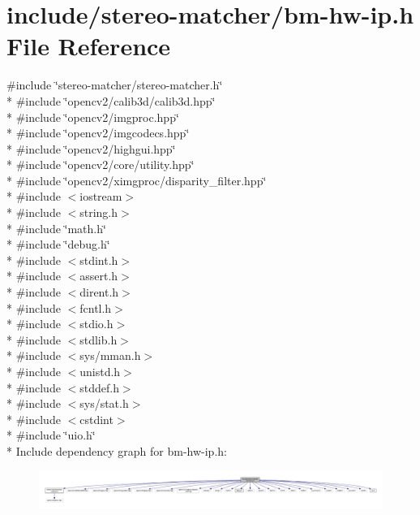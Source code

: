 \hypertarget{bm-hw-ip_8h}{}\section{include/stereo-\/matcher/bm-\/hw-\/ip.h File Reference}
\label{bm-hw-ip_8h}
{\ttfamily \#include \char`\"{}stereo-\/matcher/stereo-\/matcher.\+h\char`\"{}}\\*
{\ttfamily \#include \char`\"{}opencv2/calib3d/calib3d.\+hpp\char`\"{}}\\*
{\ttfamily \#include \char`\"{}opencv2/imgproc.\+hpp\char`\"{}}\\*
{\ttfamily \#include \char`\"{}opencv2/imgcodecs.\+hpp\char`\"{}}\\*
{\ttfamily \#include \char`\"{}opencv2/highgui.\+hpp\char`\"{}}\\*
{\ttfamily \#include \char`\"{}opencv2/core/utility.\+hpp\char`\"{}}\\*
{\ttfamily \#include \char`\"{}opencv2/ximgproc/disparity\+\_\+filter.\+hpp\char`\"{}}\\*
{\ttfamily \#include $<$iostream$>$}\\*
{\ttfamily \#include $<$string.\+h$>$}\\*
{\ttfamily \#include \char`\"{}math.\+h\char`\"{}}\\*
{\ttfamily \#include \char`\"{}debug.\+h\char`\"{}}\\*
{\ttfamily \#include $<$stdint.\+h$>$}\\*
{\ttfamily \#include $<$assert.\+h$>$}\\*
{\ttfamily \#include $<$dirent.\+h$>$}\\*
{\ttfamily \#include $<$fcntl.\+h$>$}\\*
{\ttfamily \#include $<$stdio.\+h$>$}\\*
{\ttfamily \#include $<$stdlib.\+h$>$}\\*
{\ttfamily \#include $<$sys/mman.\+h$>$}\\*
{\ttfamily \#include $<$unistd.\+h$>$}\\*
{\ttfamily \#include $<$stddef.\+h$>$}\\*
{\ttfamily \#include $<$sys/stat.\+h$>$}\\*
{\ttfamily \#include $<$cstdint$>$}\\*
{\ttfamily \#include \char`\"{}uio.\+h\char`\"{}}\\*
Include dependency graph for bm-\/hw-\/ip.h\+:
\nopagebreak
\begin{figure}[H]
\begin{center}
\leavevmode
\includegraphics[width=350pt]{bm-hw-ip_8h__incl}
\end{center}
\end{figure}
